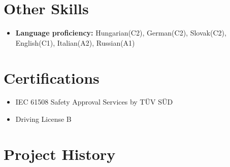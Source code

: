 \documentclass[letterpaper,11pt]{article}
\begin{document}
\section{\bf Other Skills}
\begin{itemize}
\item \textbf{Language proficiency:} Hungarian(C2), German(C2), Slovak(C2), English(C1), Italian(A2), Russian(A1)
\end{itemize}

\section{\bf Certifications}
\begin{itemize}
\item IEC 61508 Safety Approval Services by TÜV SÜD
\item Driving License B
\end{itemize}
\clearpage

\section{\bf Project History}
\end{document}
